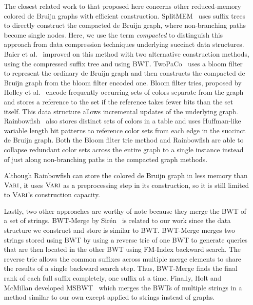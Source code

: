 The closest related work to that proposed here concerns other reduced-memory colored de Bruijn graphs with efficient construction. SplitMEM~\cite{splitmem} uses suffix trees to directly construct the compacted de Bruijn graph, where non-branching paths become single nodes.  Here, we use the term {\em compacted} to distinguish this approach from data compression techniques underlying \mbox{succinct} data structures.  Baier et al.~\cite{baier2015graphical} improved on this method with two alternative construction methods, using the compressed suffix tree and using BWT. TwoPaCo~\cite{minkin2016twopaco} uses a bloom filter to represent the ordinary de Bruijn graph and then constructs the compacted de Bruijn graph from the bloom filter encoded one.    Bloom filter tries, proposed by Holley  et al.~\cite{holley2015bloom} encode frequently occurring sets of colors separate from the graph and stores a reference to the set if the reference takes fewer bits than the set itself.   This data structure allows incremental updates of the underlying graph.  Rainbowfish~\cite{rainbowfish} also stores distinct sets of colors in a table and uses Huffman-like variable length bit patterns to reference color sets from each edge in the succinct de Bruijn graph.  Both the Bloom filter trie method and Rainbowfish are able to collapse redundant color sets across the entire graph to a single instance instead of just along non-branching paths in the compacted graph methods.

Although Rainbowfish can store the colored de Bruijn graph in less memory than $\mbox{\rm {\sc Vari}}$, it uses  $\mbox{\rm {\sc Vari}}$ as a preprocessing step in its construction, so it is still limited to  $\mbox{\rm {\sc Vari}}$'s construction capacity.

Lastly, two other approaches are worthy of note because they merge the BWT of a set of strings.  BWT-Merge by Sir{\'e}n~\cite{siren2016burrows} is related to our work since the data structure we construct and store is similar to BWT.  BWT-Merge merges two strings stored using BWT by using a reverse trie of one BWT to generate queries that are then located in the other BWT using FM-Index backward search.  The reverse trie allows the common suffixes across multiple merge elements to share the results of a single backward search step. Thus, BWT-Merge finds the final rank of each full suffix completely, one suffix at a time.   Finally, Holt and McMillan developed MSBWT~\cite{holt2014merging} which merges the BWTs of multiple strings in a method similar to our own except applied to strings instead of graphs.



